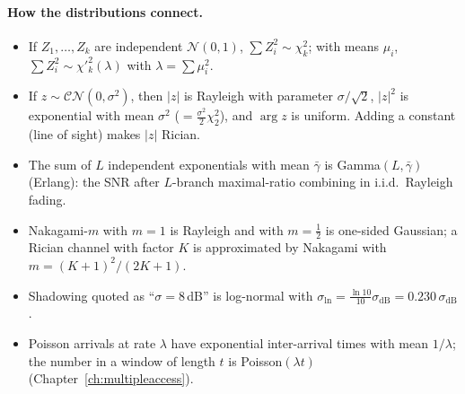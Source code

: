 \paragraph{How the distributions connect.}
\begin{itemize}[leftmargin=1.5em,itemsep=2pt]
\item If $Z_1,\dots,Z_k$ are independent $\mathcal N(0,1)$, $\sum Z_i^2\sim\chi^2_k$; with means
$\mu_i$, $\sum Z_i^2\sim\chi'^2_k(\lambda)$ with $\lambda=\sum\mu_i^2$.
\item If $z\sim\mathcal{CN}(0,\sigma^2)$, then $|z|$ is Rayleigh with parameter $\sigma/\sqrt2$,
$|z|^2$ is exponential with mean $\sigma^2$ ($=\tfrac{\sigma^2}{2}\chi^2_2$), and $\arg z$ is
uniform. Adding a constant (line of sight) makes $|z|$ Rician.
\item The sum of $L$ independent exponentials with mean $\bar\gamma$ is Gamma$(L,\bar\gamma)$
(Erlang): the SNR after $L$-branch maximal-ratio combining in i.i.d.\ Rayleigh fading.
\item Nakagami-$m$ with $m=1$ is Rayleigh and with $m=\tfrac12$ is one-sided Gaussian; a Rician
channel with factor $K$ is approximated by Nakagami with $m=(K+1)^2/(2K+1)$.
\item Shadowing quoted as ``$\sigma=8$\,dB'' is log-normal with $\sigma_{\ln}=\frac{\ln10}{10}\sigma_{\mathrm{dB}}=0.230\,\sigma_{\mathrm{dB}}$.
\item Poisson arrivals at rate $\lambda$ have exponential inter-arrival times with mean $1/\lambda$;
the number in a window of length $t$ is Poisson$(\lambda t)$ (Chapter~\ref{ch:multipleaccess}).
\end{itemize}

